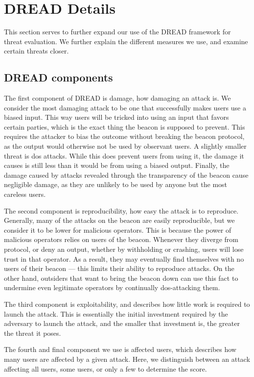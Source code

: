 \section{DREAD Details}\label{app:dread}
This section serves to further expand our use of the DREAD framework for threat evaluation.
We further explain the different measures we use, and examine certain threats closer.

\subsection{DREAD components}
The first component of DREAD is damage, how damaging an attack is.
We consider the most damaging attack to be one that successfully makes users use a biased input.
This way users will be tricked into using an input that favors certain parties, which is the exact thing the beacon is supposed to prevent.
This requires the attacker to bias the outcome without breaking the beacon protocol, as the output would otherwise not be used by observant users.
A slightly smaller threat is \acrshort{dos} attacks.
While this does prevent users from using it, the damage it causes is still less than it would be from using a biased output.
Finally, the damage caused by attacks revealed through the transparency of the beacon cause negligible damage, as they are unlikely to be used by anyone but the most careless users.

The second component is reproducibility, how easy the attack is to reproduce.
Generally, many of the attacks on the beacon are easily reproducible, but we consider it to be lower for malicious operators.
This is because the power of malicious operators relies on users of the beacon.
Whenever they diverge from protocol, or deny an output, whether by withholding or crashing, users will lose trust in that operator.
As a result, they may eventually find themselves with no users of their beacon --- this limits their ability to reproduce attacks.
On the other hand, outsiders that want to bring the beacon down can use this fact to undermine even legitimate operators by continually \acrshort{dos}-attacking them.

The third component is exploitability, and describes how little work is required to launch the attack.
This is essentially the initial investment required by the adversary to launch the attack, and the smaller that investment is, the greater the threat it poses.

The fourth and final component we use is affected users, which describes how many users are affected by a given attack.
Here, we distinguish between an attack affecting all users, some users, or only a few to determine the score.

